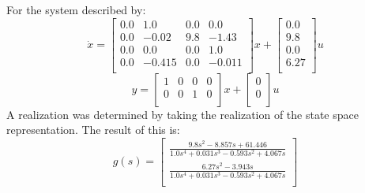 For the system described by: \begin{equation}
\dot x = \begin{bmatrix}
0.0&1.0&0.0&0.0\\0.0&-0.02&9.8&-1.43\\0.0&0.0&0.0&1.0\\0.0&-0.415&0.0&-0.011\\\end{bmatrix}
x + \begin{bmatrix}
0.0\\9.8\\0.0\\6.27\\\end{bmatrix}
u
\end{equation}
\begin{equation}
y = \begin{bmatrix}
1&0&0&0\\0&0&1&0\\\end{bmatrix}
x + \begin{bmatrix}
0\\0\\\end{bmatrix}
u
\end{equation}
A realization was determined by taking the realization of the state space representation. The result of this is: \begin{equation}g(s) = \begin{bmatrix}
\frac{9.8s^{2} - 8.857s + 61.446}{1.0s^{4} + 0.031s^{3} - 0.593s^{2} + 4.067s}\\\frac{6.27s^{2} - 3.943s}{1.0s^{4} + 0.031s^{3} - 0.593s^{2} + 4.067s}\\\end{bmatrix}
\end{equation}